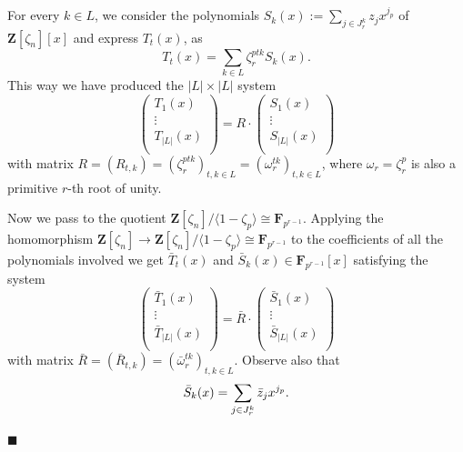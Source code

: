 \documentclass[10pt,a4paper]{amsart}
\newenvironment{proofofB}{{\bf {Proof of Theorem \ref{Thm:B}.} }}{\hfill $\blacksquare$ \\}
\def\Z{\mathbf{Z}}
\def\F{\mathbf{F}}
\begin{document}
\begin{proofofB}
For every $k \in L$,  we consider the polynomials    
$S_k(x) := \sum_{j \in J_r^k} z_j x^{j_p}$ of $  \Z[\zeta_n][x]$ and express $T_t(x)$,  as  
\begin{equation}\label{eq:T-S}
T_t(x) = \sum_{k\in L}  \zeta_r^{ptk} S_k(x). 
\end{equation}
This way we have produced the $|L| \times |L|$ system 
\begin{equation}\label{eq:system}
   \left( \begin{matrix}
    T_1(x)\\
    \vdots\\
    T_{|L|}(x)\\
\end{matrix}
\right)
= R \cdot  \left( \begin{matrix}
    S_1(x)\\
    \vdots\\
    S_{|L|}(x)\\
\end{matrix}
\right) 
\end{equation}
with matrix $R= (R_{t,k})=(\zeta_r^{ptk})_{t, k \in L}= (\omega_r^{tk})_{t, k \in L}$,  where $\omega_r= \zeta_r^p$ is also a primitive $r$-th root of unity. 

Now we pass to the quotient $\Z[\zeta_n]/\langle 1- \zeta_p \rangle \cong \F_{p^{r-1}}$. 
Applying the homomorphism 
$\Z[\zeta_n] \to \Z[\zeta_n]/\langle 1- \zeta_p \rangle \cong \F_{p^{r-1}}$ to the coefficients of  all the polynomials involved we get $\bar{T}_t(x)$  and $\bar{S}_k(x)  \in \F_{p^{r-1}}[x]$ satisfying the system 
\begin{equation}\label{eq:systemInF_p}
   \left( \begin{matrix}
    \bar{T}_1(x)\\
    \vdots\\
    \bar{T}_{|L|}(x)\\
\end{matrix}
\right)
= \bar{R} \cdot  \left( \begin{matrix}
    \bar{S}_1(x)\\
    \vdots\\
    \bar{S}_{|L|}(x)\\
\end{matrix}
\right) 
\end{equation}
with matrix $\bar{R}= (\bar{R}_{t,k})=(\bar{\omega}_r^{tk})_{t, k \in L}$.
Observe also that 
\begin{equation}\label{eq:bar{s}}
    \bar{S}_k(x)=\sum_{j \in J_r^k} \bar{z}_j x^{j_p}. 
\end{equation}



\end{proofofB}
\end{document}
